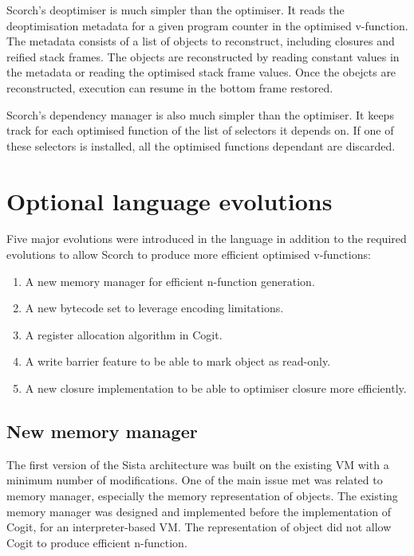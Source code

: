 \documentclass[a4paper,12pt,twoside]{../includes/ThesisStyle}
\begin{document}
Scorch's deoptimiser is much simpler than the optimiser. It reads the deoptimisation metadata for a given program counter in the optimised v-function. The metadata consists of a list of objects to reconstruct, including closures and reified stack frames. The objects are reconstructed by reading constant values in the metadata or reading the optimised stack frame values. Once the obejcts are reconstructed, execution can resume in the bottom frame restored.

Scorch's dependency manager is also much simpler than the optimiser. It keeps track for each optimised function of the list of selectors it depends on. If one of these selectors is installed, all the optimised functions dependant are discarded. 


\section{Optional language evolutions}


Five major evolutions were introduced in the language in addition to the required evolutions to allow Scorch to produce more efficient optimised v-functions:
\begin{enumerate}
	\item A new memory manager for efficient n-function generation.
	\item A new bytecode set to leverage encoding limitations.
	\item A register allocation algorithm in Cogit.
	\item A write barrier feature to be able to mark object as read-only.
	\item A new closure implementation to be able to optimiser closure more efficiently.
\end{enumerate}

\subsection{New memory manager}

The first version of the Sista architecture was built on the existing VM with a minimum number of modifications. One of the main issue met was related to memory manager, especially the memory representation of objects. The existing memory manager was designed and implemented before the implementation of Cogit, for an interpreter-based VM. The representation of object did not allow Cogit to produce efficient n-function.
\end{document}
